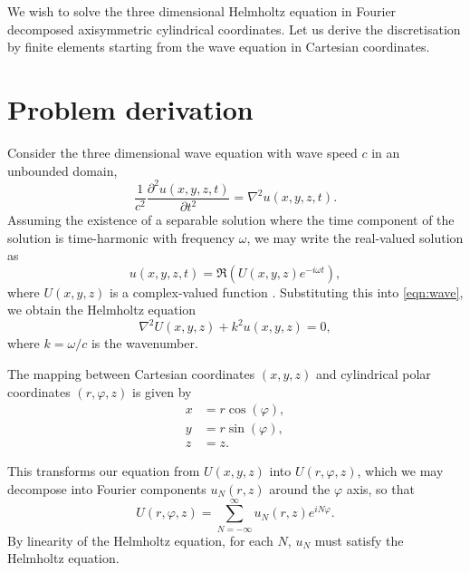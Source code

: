 \iffalse

Background definitions, notations, etc.
Problem definition
	- Relation to Helmholtz
Boundary condition
	- Sommerfeld
	- PML/ABC/DtN
Shifted Laplace operator


The Poisson problem:
	- Well behaved
	- Eigenvalues of the residual
	- Optimal method for finding solution

Helmholtz problem:
	- Misbehaved
	- Poor convergence
	- Indefinite discretisation matrix
\fi

We wish to solve the three dimensional Helmholtz equation in Fourier decomposed axisymmetric cylindrical coordinates.
Let us derive the discretisation by finite elements starting from the wave equation in Cartesian coordinates.

\section{Problem derivation}

Consider the three dimensional wave equation with wave speed $c$ in an unbounded domain,
\begin{equation}
	\frac{1}{c^2} \frac{\partial^2 u(x,y,z,t)}{\partial t^2} = \nabla^2 u(x,y,z,t). \label{eqn:wave}
\end{equation}
Assuming the existence of a separable solution where the time component of the solution is time-harmonic with frequency $\omega$,
we may write the real-valued solution as
\[
	u(x,y,z,t) = \Re \left( U(x,y,z)e^{-i\omega t} \right),
\]
where $U(x,y,z)$ is a complex-valued function \cite{oomph_hh}.
Substituting this into \eqref{eqn:wave}, we obtain the Helmholtz equation
\begin{equation}
	\nabla^2 U(x,y,z) + k^2 u(x,y,z) = 0, \label{eqn:hh}
\end{equation}
where $k=\omega/c$ is the wavenumber.

The mapping between Cartesian coordinates $(x,y,z)$ and cylindrical polar coordinates $(r,\varphi,z)$ is given by
\begin{align}
	x &= r\cos(\varphi), \\
	y &= r\sin(\varphi), \\
	z &= z.
\end{align}

This transforms our equation from $U(x,y,z)$ into $U(r,\varphi,z)$, 
which we may decompose into Fourier components $u_N(r,z)$ around the $\varphi$ axis, so that
\begin{equation}
	U(r,\varphi,z) = \sum_{N=-\infty}^\infty u_N(r,z) e^{iN\varphi}.
\end{equation}
By linearity of the Helmholtz equation, for each $N$, $u_N$ must satisfy the Helmholtz equation.

